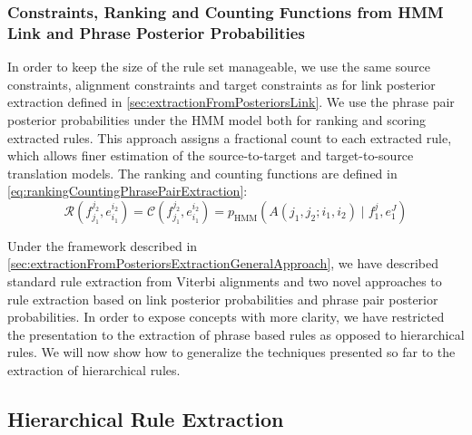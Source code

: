 \subsubsection{Constraints, Ranking and Counting Functions from HMM Link and Phrase Posterior Probabilities}

In order to keep the size of the rule set manageable, we use
the same source constraints, alignment constraints and target constraints
as for link posterior extraction defined in
\autoref{sec:extractionFromPosteriorsLink}.
We use the phrase pair posterior probabilities under the HMM model both for ranking
and scoring
extracted rules. This approach assigns a fractional count to each extracted
rule, which allows finer estimation of the source-to-target and target-to-source
translation models.  The ranking and counting functions
are defined in \autoref{eq:rankingCountingPhrasePairExtraction}:
%
\begin{equation}
  \mathcal{R}(f_{j_1}^{j_2},e_{i_1}^{i_2}) = \mathcal{C}(f_{j_1}^{j_2},e_{i_1}^{i_2}) = p_{\text{HMM}}(A(j_1, j_2; i_1, i_2) \mid f_1^j, e_1^J)
  \label{eq:rankingCountingPhrasePairExtraction}
\end{equation}

Under the framework described in
\autoref{sec:extractionFromPosteriorsExtractionGeneralApproach}, we have
described standard rule extraction from Viterbi alignments and two novel
approaches to rule extraction based on link posterior probabilities and
phrase pair posterior probabilities. In order to expose concepts with more
clarity, we have restricted the presentation
to the extraction of phrase based rules as opposed to hierarchical rules.
We will now show how to generalize the techniques presented so far to
the extraction of hierarchical rules.

\subsection{Hierarchical Rule Extraction}
\label{sec:extractionFromPosteriorsExtractionDisjoint}

